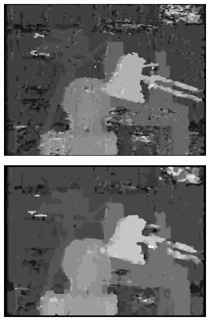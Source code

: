 \documentclass[a4paper]{scrartcl}
\begin{document}
\vspace{1cm}
\begin{minipage}{0.8\textwidth}
  \centering
  \includegraphics[width=0.8\textwidth]{images/disparity-r1-ssd-d20-m1.png}
  \label{fig:disparity-r1-ssd-d20-m1}
\end{minipage}

\vspace{1cm}
\begin{minipage}{0.8\textwidth}
  \centering
  \includegraphics[width=0.8\textwidth]{images/disparity-r3-ssd-d20-m1.png}
  \label{fig:disparity-r3-ssd-d20-m1}
\end{minipage}
\end{document}
